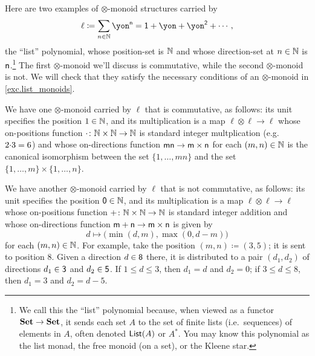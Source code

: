 \documentclass[Book-Poly]{subfiles}
\begin{document}
\begin{example}\label{ex.list_monoids}
Here are two examples of $\otimes$-monoid structures carried by 
\[\ell \coloneqq \sum_{n\in\nn} \yon^{\ord{n}} = \1+\yon+\yon^\2+\cdots,\]
the ``list'' polynomial, whose position-set is $\mathbb{N}$ and whose direction-set at $n\in\mathbb{N}$ is $\mathsf{n}$.\footnote{We call this the ``list'' polynomial because, when viewed as a functor $\mathbf{Set}\to\mathbf{Set}$, it sends each set $A$ to the set of finite lists (i.e.\ sequences) of elements in $A$, often denoted $\mathsf{List}(A)$ or $A^*$.
You may know this polynomial as the list monad, the free monoid (on a set), or the Kleene star.}
The first $\otimes$-monoid we'll discuss is commutative, while the second $\otimes$-monoid is not.
We will check that they satisfy the necessary conditions of an $\otimes$-monoid in \cref{exc.list_monoids}.

We have one $\otimes$-monoid carried by $\ell$ that is commutative, as follows: its unit specifies the position $1\in\mathbb{N}$, and its multiplication is a map $\ell\otimes\ell \to \ell$ whose on-positions function $\cdot \colon \mathbb{N}\times\mathbb{N} \to \mathbb{N}$ is standard integer multplication (e.g.\ $2{\cdot}3=6$) and whose on-directions function $\mathsf{mn} \to \mathsf{m} \times \mathsf{n}$ for each $(m,n)\in\mathbb{N}$ is the canonical isomorphism between the set $\{1,\ldots,mn\}$ and the set $\{1,\ldots,m\}\times\{1,\ldots,n\}$.

We have another $\otimes$-monoid carried by $\ell$ that is not commutative, as follows: its unit specifies the position $\textsf{0}\in\mathbb{N}$, and its multiplication is a map $\ell\otimes\ell \to \ell$ whose on-positions function $+ \colon \mathbb{N}\times\mathbb{N} \to \mathbb{N}$ is standard integer addition and whose on-directions function $\mathsf{m+n} \to \mathsf{m} \times \mathsf{n}$ is given by
\[
    d \mapsto \big(\min(d,m), \max(0,d-m)\big)
\]
for each $(m,n)\in\mathbb{N}$.
For example, take the position $(m,n)\coloneqq(3,5)$; it is sent to position $8$. Given a direction $d \in \mathsf{8}$ there, it is distributed to a pair $(d_1, d_2)$ of directions $d_1 \in \mathsf{3}$ and $d_2 \in \mathsf{5}$.
If $1 \leq d \leq 3$, then $d_1=d$ and $d_2=0$; if $3 \leq d \leq 8$, then $d_1=3$ and $d_2=d-5$.
\end{example}
\end{document}
